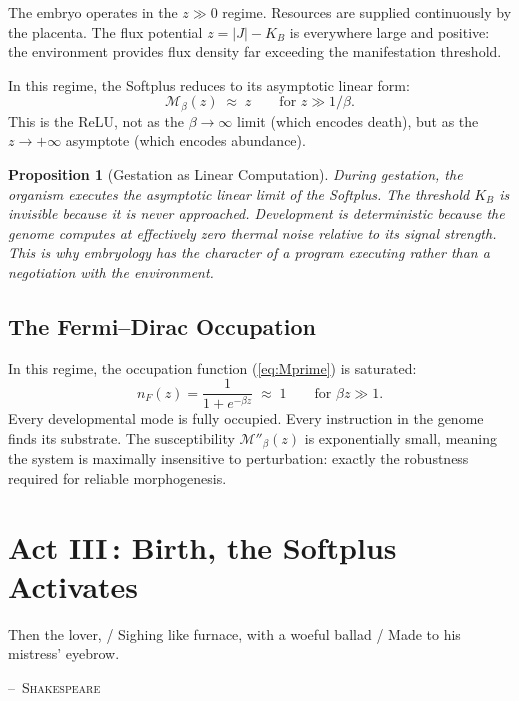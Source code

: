 \documentclass[12pt, letterpaper]{article}
\theoremstyle{plain}
\newtheorem{proposition}[theorem]{Proposition}
\theoremstyle{definition}
\theoremstyle{remark}
\newcommand{\Mop}{\mathcal{M}}            %
\newcommand{\KB}{K_{\!B}}                 %
\newcommand{\nF}{n_{\!F}}                 %
\begin{document}
The embryo operates in the $z \gg 0$ regime. Resources are supplied continuously by the placenta. The flux potential $z = |J| - \KB$ is everywhere large and positive: the environment provides flux density far exceeding the manifestation threshold.

In this regime, the Softplus reduces to its asymptotic linear form:
\begin{equation}\label{eq:gestation_relu}
  \Mop_\beta(z) \;\approx\; z
  \qquad \text{for } z \gg 1/\beta.
\end{equation}
This is the ReLU, not as the $\beta \to \infty$ limit (which encodes death), but as the $z \to +\infty$ asymptote (which encodes abundance).

\begin{proposition}[Gestation as Linear Computation]\label{prop:gestation}
  During gestation, the organism executes the asymptotic linear limit of the Softplus. The threshold $\KB$ is invisible because it is never approached. Development is deterministic because the genome computes at effectively zero thermal noise relative to its signal strength. This is why embryology has the character of a program executing rather than a negotiation with the environment.
\end{proposition}

\subsection{The Fermi--Dirac Occupation}

In this regime, the occupation function (\ref{eq:Mprime}) is saturated:
\begin{equation}
  \nF(z) = \frac{1}{1 + e^{-\beta z}} \;\approx\; 1
  \qquad \text{for } \beta z \gg 1.
\end{equation}
Every developmental mode is fully occupied. Every instruction in the genome finds its substrate. The susceptibility $\Mop''_\beta(z)$ is exponentially small, meaning the system is maximally insensitive to perturbation: exactly the robustness required for reliable morphogenesis.


\section{\texorpdfstring{Act III\,: Birth, the Softplus Activates}{Act III: Birth, the Softplus Activates}}
\label{sec:act3}

\epigraph{Then the lover, / Sighing like furnace, with a woeful ballad / Made to his mistress' eyebrow.}{\textsc{--~Shakespeare}}
\end{document}
